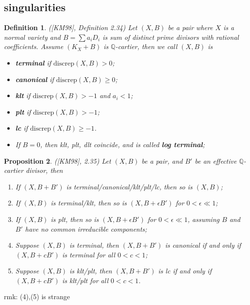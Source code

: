 \documentclass{article}
\newtheorem{defn}{Definition}[section]
\newtheorem{prop}[defn]{Proposition}
\begin{document}
\subsection{singularities}

\begin{defn}
  ([KM98], Definition 2.34) Let $ (X,B) $ be a pair where $ X $ is a normal variety and $ B=\sum a_iD_i $ is sum of distinct prime divisors with rational coefficients. Assume $ (K_X+B) $ is $ \mathbb{Q} $-cartier, then we call $ (X,B) $ is 
  \begin{itemize}
    \item \textbf{terminal} if $ \mathrm{discrep}(X,B) >0$;
    \item \textbf{canonical} if $ \mathrm{discrep}(X,B) \geqslant 0$;
    \item \textbf{klt} if $ \mathrm{discrep}(X,B) >-1$ and $ a_i<1 $;
    \item \textbf{plt} if $ \mathrm{discrep}(X,B) >-1$;
    \item \textbf{lc} if $ \mathrm{discrep}(X,B) \geqslant -1 $. 
    \item If $ B=0 $, then klt, plt, dlt coincide, and is called \textbf{log terminal};
  \end{itemize}
\end{defn}

\begin{prop}
  ([KM98], 2.35) Let $ (X,B) $ be a pair, and $ B' $ be  an effective $ \mathbb{Q} $-cartier divisor, then
  \begin{enumerate}
    \item If $ (X, B+B') $ is terminal/canonical/klt/plt/lc, then so is $ (X,B) $;
    \item If $ (X,B) $ is terminal/klt, then so is $ (X,B+\epsilon B') $ for $ 0<\epsilon\ll 1 $;
    \item If $ (X,B) $ is plt, then so is $ (X,B+\epsilon B') $ for $ 0<\epsilon\ll 1 $, assuming $ B $ and $ B' $ have no common irreducible components;
    \item Suppose $ (X,B) $ is terminal, then $ (X,B+B') $ is canonical if and only if $ (X,B+cB') $ is terminal for all $ 0<c<1 $;
    \item Suppose $ (X,B) $ is klt/plt, then $ (X,B+B') $ is lc if and only if $ (X,B+cB') $ is klt/plt for all $ 0<c<1 $.
  \end{enumerate}
\end{prop}
  rmk: (4),(5) is strange
  
\end{document}

